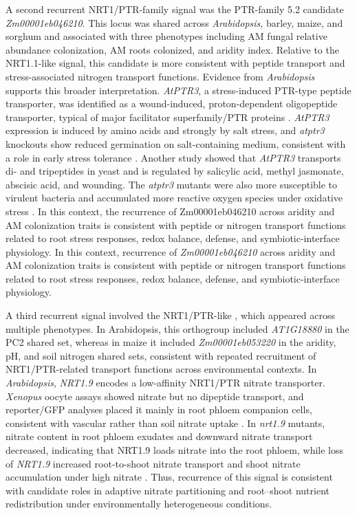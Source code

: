 \documentclass[unnumsec,webpdf,contemporary,large]{oup-authoring-template}%
\theoremstyle{thmstyleone}%
\theoremstyle{thmstyletwo}%
\theoremstyle{thmstylethree}%
\begin{document}
A second recurrent NRT1/PTR-family signal was the PTR-family 5.2 candidate \textit{Zm00001eb046210}. This locus was shared across \textit{Arabidopsis}, barley, maize, and sorghum and associated with three phenotypes including AM fungal relative abundance colonization, AM roots colonized, and aridity index. Relative to the NRT1.1-like signal, this candidate is more consistent with peptide transport and stress-associated nitrogen transport functions. Evidence from \textit{Arabidopsis} supports this broader interpretation. \textit{AtPTR3}, a stress-induced PTR-type peptide transporter, was identified as a wound-induced, proton-dependent oligopeptide transporter, typical of major facilitator superfamily/PTR proteins \citep{Karim2005AtPTR3}. \textit{AtPTR3} expression is induced by amino acids and strongly by salt stress, and \textit{atptr3} knockouts show reduced germination on salt-containing medium, consistent with a role in early stress tolerance \citep{Karim2005AtPTR3}. Another study showed that \textit{AtPTR3} transports di- and tripeptides in yeast and is regulated by salicylic acid, methyl jasmonate, abscisic acid, and wounding. The \textit{atptr3} mutants were also more susceptible to virulent bacteria and accumulated more reactive oxygen species under oxidative stress \citep{Karim2007AtPTR3}. In this context, the recurrence of Zm00001eb046210 across aridity and AM colonization traits is consistent with peptide or nitrogen transport functions related to root stress responses, redox balance, defense, and symbiotic-interface physiology. In this context, recurrence of \textit{Zm00001eb046210} across aridity and AM colonization traits is consistent with peptide or nitrogen transport functions related to root stress responses, redox balance, defense, and symbiotic-interface physiology.


A third recurrent signal involved the NRT1/PTR-like , which appeared across multiple phenotypes. In Arabidopsis, this orthogroup included \textit{AT1G18880} in the PC2 shared set, whereas in maize it included \textit{Zm00001eb053220} in the aridity, pH, and soil nitrogen shared sets, consistent with repeated recruitment of NRT1/PTR-related transport functions across environmental contexts. In \textit{Arabidopsis}, \textit{NRT1.9} encodes a low-affinity NRT1/PTR nitrate transporter. \textit{Xenopus} oocyte assays showed nitrate but no dipeptide transport, and reporter/GFP analyses placed it mainly in root phloem companion cells, consistent with vascular rather than soil nitrate uptake \citep{Wang2011NRT19}. In \textit{nrt1.9} mutants, nitrate content in root phloem exudates and downward nitrate transport decreased, indicating that NRT1.9 loads nitrate into the root phloem, while loss of \textit{NRT1.9} increased root-to-shoot nitrate transport and shoot nitrate accumulation under high nitrate \citep{Wang2011NRT19}. Thus, recurrence of this signal is consistent with candidate roles in adaptive nitrate partitioning and root--shoot nutrient redistribution under environmentally heterogeneous conditions.
\end{document}
